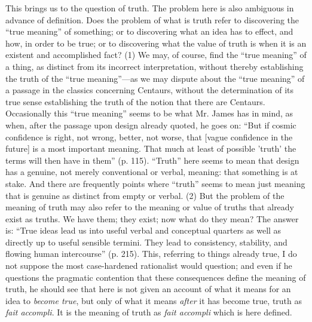 \documentclass[12pt]{article}
\begin{document}
This brings us to the question of truth. The problem here is also
ambiguous in advance of definition. Does the problem of what is truth
refer to discovering the ``true meaning'' of something; or to
discovering what an idea has to effect, and how, in order to be true;
or to discovering what the value of truth is when it is an existent
and accomplished fact? (1) We may, of course, find the ``true meaning''
of a thing, as distinct from its incorrect interpretation, without
thereby establishing the truth of the ``true meaning''---as we may
dispute about the ``true meaning'' of a passage in the classics
concerning Centaurs, without the determination of its true sense
establishing the truth of the notion that there are Centaurs.
Occasionally this ``true meaning'' seems to be what Mr. James has in
mind, as when, after the passage upon design already quoted, he goes
on: ``But if cosmic confidence is right, not wrong, better, not worse,
that [vague confidence in the future] is a most important meaning.
That much at least of possible 'truth' the terms will then have in
them'' (p. 115). ``Truth'' here seems to mean that design has a genuine,
not merely conventional or verbal, meaning: that something is at
stake. And there are frequently points where ``truth'' seems to mean
just meaning that is genuine as distinct from empty or verbal. (2) But
the problem of the meaning of truth may also refer to the meaning or
value of truths that already exist as truths. We have them; they
exist; now what do they mean? The answer is: ``True ideas lead us into
useful verbal and conceptual quarters as well as directly up to useful
sensible termini. They lead to consistency, stability, and flowing
human intercourse'' (p. 215). This, referring to things already true, I
do not suppose the most case-hardened rationalist would question; and
even if he questions the pragmatic contention that these consequences
define the meaning of truth, he should see that here is not given an
account of what it means for an idea to \emph{become true}, but only of
what it means \emph{after} it has become true, truth as \emph{fait accompli}. It
is the meaning of truth as \emph{fait accompli} which is here defined.
\end{document}
